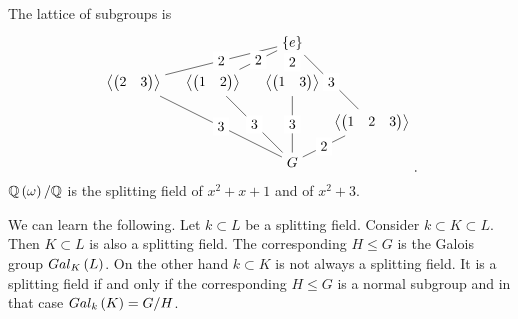 \begin{example1}
$$\begin{array}{rrl}
\end{array}
$$
The lattice of subgroups is
$$
\begin{tikzpicture}
\node (E) at (0, 3) {$ \cb{e} $};
\node (K1) at (-4, 2) {$ \ab{\onebytwo{2}{3}} $};
\node (K2) at (-2, 2) {$ \ab{\onebytwo{1}{2}} $};
\node (K3) at (0, 2) {$ \ab{\onebytwo{1}{3}} $};
\node (K) at (2, 1) {$ \ab{\onebythree{1}{2}{3}} $};
\node (G) at (0, 0) {$ G $};
\draw (E) -- node[fill=white]{2} (K1) -- node[fill=white]{3} (G);
\draw (E) -- node[fill=white]{2} (K2) -- node[fill=white]{3} (G);
\draw (E) -- node[fill=white]{2} (K3) -- node[fill=white]{3} (G);
\draw (E) -- node[fill=white]{3} (K) -- node[fill=white]{2} (G);
\end{tikzpicture}.
$$
$ \mathbb{Q}\left( \omega \right) / \mathbb{Q} $ is the splitting field of $ x^2 + x + 1 $ and of $ x^2 + 3 $.
\end{example1}

We can learn the following. Let $ k \subset L $ be a splitting field. Consider $ k \subset K \subset L $. Then $ K \subset L $ is also a splitting field. The corresponding $ H \le G $ is the Galois group $ Gal_K\left( L \right) $. On the other hand $ k \subset K $ is not always a splitting field. It is a splitting field if and only if the corresponding $ H \le G $ is a normal subgroup and in that case $ Gal_k\left( K \right) = G / H $.

